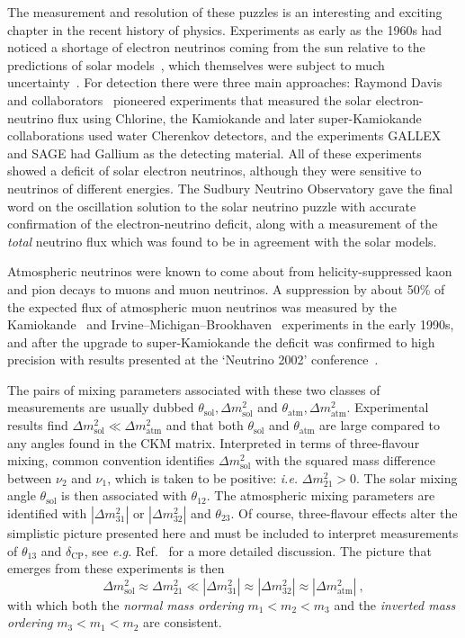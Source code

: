   The measurement and resolution of these puzzles is an interesting and exciting
  chapter in the recent history of physics. Experiments as early as the 1960s
  had noticed a shortage of electron neutrinos coming from the sun relative to
  the predictions of solar models~\cite{RevModPhys.60.297, 1988ApJ...335..415T,
    RevModPhys.64.885, RevModPhys.67.781}, which themselves were subject to much
  uncertainty~\cite{}. For detection there were three main approaches: Raymond
  Davis and collaborators~\cite{} pioneered experiments that measured the solar
  electron-neutrino flux using Chlorine, the Kamiokande and later
  super-Kamiokande collaborations used water Cherenkov detectors, and the
  experiments GALLEX and SAGE had Gallium as the detecting material. All of
  these experiments showed a deficit of solar electron neutrinos, although they
  were sensitive to neutrinos of different energies. The Sudbury Neutrino
  Observatory gave the final word on the oscillation solution to the solar
  neutrino puzzle with accurate confirmation of the electron-neutrino deficit,
  along with a measurement of the \textit{total} neutrino flux which was found
  to be in agreement with the solar models.

  Atmospheric neutrinos were known to come about from helicity-suppressed kaon
  and pion decays to muons and muon neutrinos. A suppression by about 50\% of
  the expected flux of atmospheric muon neutrinos was measured by the
  Kamiokande~\cite{} and Irvine--Michigan--Brookhaven~\cite{} experiments in the
  early 1990s, and after the upgrade to super-Kamiokande the deficit was
  confirmed to high precision with results presented at the `Neutrino 2002'
  conference~\cite{}.

  The pairs of mixing parameters associated with these two classes of
  measurements are usually dubbed
  $\theta_{\text{sol}}, \Delta m^{2}_{\text{sol}}$ and
  $\theta_{\text{atm}}, \Delta m^{2}_{\text{atm}}$. Experimental results find
  $\Delta m^{2}_{\text{sol}} \ll \Delta m^{2}_{\text{atm}}$ and that both
  $\theta_{\text{sol}}$ and $\theta_{\text{atm}}$ are large compared to any
  angles found in the CKM matrix. Interpreted in terms of three-flavour mixing,
  common convention identifies $\Delta m_{\text{sol}}^{2}$ with the squared mass
  difference between $\nu_{2}$ and $\nu_{1}$, which is taken to be positive:
  \textit{i.e.} $\Delta m^{2}_{21} > 0$. The solar mixing angle
  $\theta_{\text{sol}}$ is then associated with $\theta_{12}$. The atmospheric
  mixing parameters are identified with $|\Delta m_{31}^{2}|$ or
  $|\Delta m_{32}^{2}|$ and $\theta_{23}$. Of course, three-flavour effects
  alter the simplistic picture presented here and must be included to interpret
  measurements of $\theta_{13}$ and $\delta_{\text{CP}}$, see \textit{e.g.}
  Ref.~\cite{} for a more detailed discussion. The picture that emerges from
  these experiments is then
  \begin{equation}
    \Delta m^{2}_{\text{sol}} \approx \Delta m^{2}_{21} \ll |\Delta m_{31}^{2}| \approx |\Delta m_{32}^{2}| \approx |\Delta m_{\text{atm}}^{2}| \ ,
  \end{equation}
  with which both the \textit{normal mass ordering} $m_{1} < m_{2} < m_{3}$ and
  the \textit{inverted mass ordering} $m_{3} < m_{1} < m_{2}$ are consistent.

